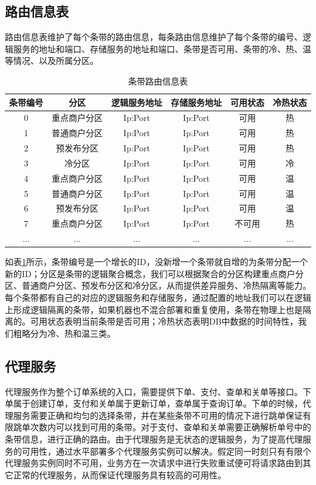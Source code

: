 \documentclass[letterpaper,twocolumn,10pt]{article}
\begin{document}
\subsection{路由信息表}
路由信息表维护了每个条带的路由信息，每条路由信息维护了每个条带的编号、逻辑服务的地址和端口、存储服务的地址和端口、条带是否可用、条带的冷、热、温等情况、以及所属分区。
\begin{table}[htp]
\caption{条带路由信息表}
\begin{center}
\begin{tabular}{|c|c|c|c|c|c|}
\hline
条带编号 & 分区 & 逻辑服务地址 & 存储服务地址 & 可用状态 & 冷热状态 \\
\hline
\hline
0 & 重点商户分区 & Ip:Port  &  Ip:Port  & 可用 & 热 \\
\hline
1 & 普通商户分区 & Ip:Port  &  Ip:Port & 可用 & 热 \\
\hline
2 & 预发布分区 & Ip:Port  &  Ip:Port & 可用 & 热 \\
\hline
3 & 冷分区 & Ip:Port  &  Ip:Port & 可用 & 冷 \\
\hline
4 & 重点商户分区 & Ip:Port  &  Ip:Port  & 可用 & 温 \\
\hline
5 & 普通商户分区 & Ip:Port  &  Ip:Port & 可用 & 温 \\
\hline
6 & 预发布分区 & Ip:Port  &  Ip:Port & 可用 & 温 \\
\hline
7 & 重点商户分区 & Ip:Port  &  Ip:Port  & 不可用 & 热 \\
\hline
... & ... & ... & ... & ... & ... \\
\hline
\end{tabular}
\end{center}
\label{route}
\end{table}%

如表\ref{route}所示，条带编号是一个增长的ID，没新增一个条带就自增的为条带分配一个新的ID；分区是条带的逻辑聚合概念，我们可以根据聚合的分区构建重点商户分区、普通商户分区、预发布分区和冷分区，从而提供差异服务、冷热隔离等能力。每个条带都有自己的对应的逻辑服务和存储服务，通过配置的地址我们可以在逻辑上形成逻辑隔离的条带，如果机器也不混合部署和重复使用，条带在物理上也是隔离的。可用状态表明当前条带是否可用；冷热状态表明DB中数据的时间特性，我们粗略分为冷、热和温三类。

\subsection{代理服务}
代理服务作为整个订单系统的入口，需要提供下单、支付、查单和关单等接口。下单属于创建订单，支付和关单属于更新订单，查单属于查询订单。下单的时候，代理服务需要正确和均匀的选择条带，并在某些条带不可用的情况下进行跳单保证有限跳单次数内可以找到可用的条带。对于支付、查单和关单需要正确解析单号中的条带信息，进行正确的路由。由于代理服务是无状态的逻辑服务，为了提高代理服务的可用性，通过水平部署多个代理服务实例可以解决。假定同一时刻只有有限个代理服务实例同时不可用，业务方在一次请求中进行失败重试便可将请求路由到其它正常的代理服务，从而保证代理服务具有较高的可用性。
\end{document}
